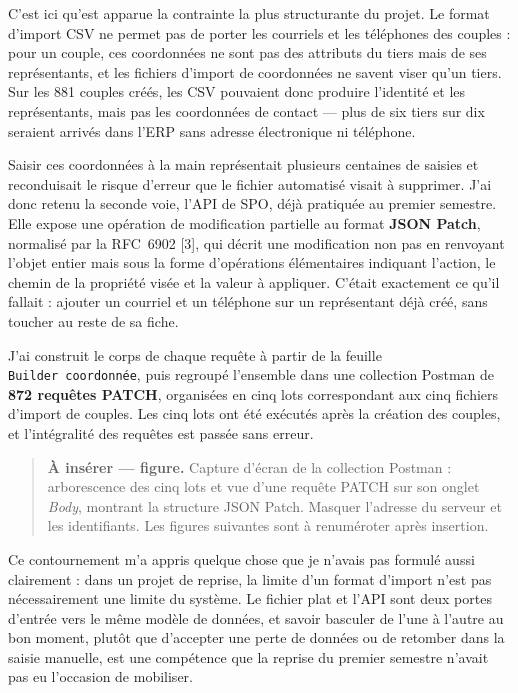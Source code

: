 C'est ici qu'est apparue la contrainte la plus structurante du projet. Le format d'import CSV
ne permet pas de porter les courriels et les téléphones des couples : pour un couple, ces
coordonnées ne sont pas des attributs du tiers mais de ses représentants, et les fichiers
d'import de coordonnées ne savent viser qu'un tiers. Sur les 881 couples créés, les CSV
pouvaient donc produire l'identité et les représentants, mais pas les coordonnées de contact ---
plus de six tiers sur dix seraient arrivés dans l'ERP sans adresse électronique ni téléphone.

Saisir ces coordonnées à la main représentait plusieurs centaines de saisies et reconduisait
le risque d'erreur que le fichier automatisé visait à supprimer. J'ai donc retenu la seconde
voie, l'API de SPO, déjà pratiquée au premier semestre. Elle expose une opération de
modification partielle au format \textbf{JSON Patch}, normalisé par la RFC~6902 {[}3{]}, qui décrit une
modification non pas en renvoyant l'objet entier mais sous la forme d'opérations élémentaires
indiquant l'action, le chemin de la propriété visée et la valeur à appliquer. C'était
exactement ce qu'il fallait : ajouter un courriel et un téléphone sur un représentant déjà
créé, sans toucher au reste de sa fiche.

J'ai construit le corps de chaque requête à partir de la feuille \texttt{Builder\ coordonnée}, puis
regroupé l'ensemble dans une collection Postman de \textbf{872 requêtes PATCH}, organisées en cinq
lots correspondant aux cinq fichiers d'import de couples. Les cinq lots ont été exécutés après
la création des couples, et l'intégralité des requêtes est passée sans erreur.

\begin{quote}
\textbf{À insérer --- figure.} Capture d'écran de la collection Postman : arborescence des cinq
lots et vue d'une requête PATCH sur son onglet \emph{Body}, montrant la structure JSON Patch.
Masquer l'adresse du serveur et les identifiants. Les figures suivantes sont à renuméroter
après insertion.
\end{quote}

Ce contournement m'a appris quelque chose que je n'avais pas formulé aussi clairement : dans
un projet de reprise, la limite d'un format d'import n'est pas nécessairement une limite du
système. Le fichier plat et l'API sont deux portes d'entrée vers le même modèle de données, et
savoir basculer de l'une à l'autre au bon moment, plutôt que d'accepter une perte de données
ou de retomber dans la saisie manuelle, est une compétence que la reprise du premier semestre
n'avait pas eu l'occasion de mobiliser.

